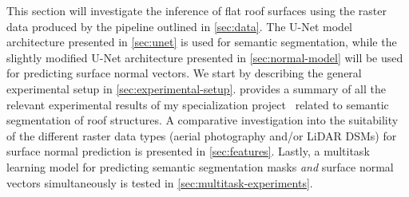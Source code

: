 This section will investigate the inference of flat roof surfaces using the raster data produced by the pipeline outlined in \cref{sec:data}.
The U-Net model architecture presented in \cref{sec:unet} is used for semantic segmentation, while the slightly modified U-Net architecture presented in \cref{sec:normal-model} will be used for predicting surface normal vectors.
We start by describing the general experimental setup in \cref{sec:experimental-setup}.
 provides a summary of all the relevant experimental results of my specialization project~\cite{specialization-project} related to semantic segmentation of roof structures.
A comparative investigation into the suitability of the different raster data types (aerial photography and/or LiDAR DSMs) for surface normal prediction is presented in \cref{sec:features}.
Lastly, a multitask learning model for predicting semantic segmentation masks \emph{and} surface normal vectors simultaneously is tested in \cref{sec:multitask-experiments}.
